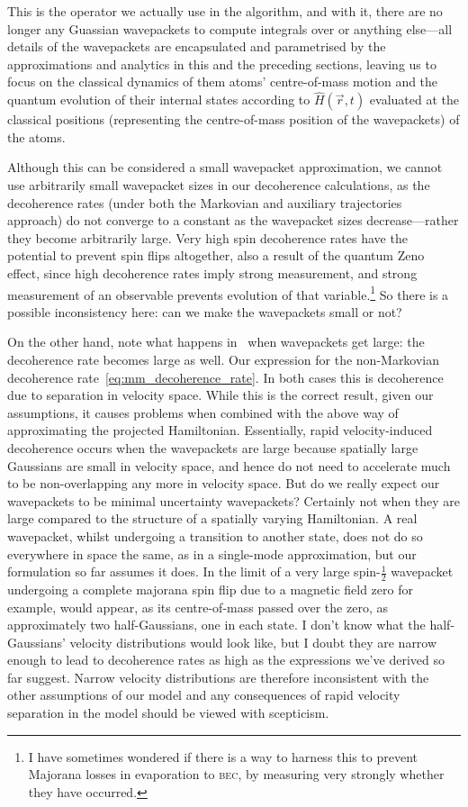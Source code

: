 This is the operator we actually use in the algorithm, and with it, there are no longer any Guassian wavepackets to compute integrals over or anything else---all details of the wavepackets are encapsulated and parametrised by the approximations and analytics in this and the preceding sections, leaving us to focus on the classical dynamics of them atoms' centre-of-mass motion and the quantum evolution of their internal states according to $\hat H(\vec r, t)$ evaluated at the classical positions (representing the centre-of-mass position of the wavepackets) of the atoms.

Although this can be considered a small wavepacket approximation, we cannot use arbitrarily small wavepacket sizes in our decoherence calculations, as the decoherence rates (under both the Markovian and auxiliary trajectories approach) do not converge to a constant as the wavepacket sizes decrease---rather they become arbitrarily large. Very high spin decoherence rates have the potential to prevent spin flips altogether, also a result of the quantum Zeno effect, since high decoherence rates imply strong measurement, and strong measurement of an observable prevents evolution of that variable.\footnote{I have sometimes wondered if there is a way to harness this to prevent Majorana losses in evaporation to \textsc{bec}, by measuring very strongly whether they have occurred.} So there is a possible inconsistency here: can we make the wavepackets small or not?

On the other hand, note what happens in~ when wavepackets get large: the decoherence rate becomes large as well. Our expression for the non-Markovian decoherence rate~\eqref{eq:mm_decoherence_rate}. In both cases this is decoherence due to separation in velocity space. While this is the correct result, given our assumptions, it causes problems when combined with the above way of approximating the projected Hamiltonian. Essentially, rapid velocity-induced decoherence occurs when the wavepackets are large because spatially large Gaussians are small in velocity space, and hence do not need to accelerate much to be non-overlapping any more in velocity space. But do we really expect our wavepackets to be minimal uncertainty wavepackets? Certainly not when they are large compared to the structure of a spatially varying Hamiltonian. A real wavepacket, whilst undergoing a transition to another state, does not do so everywhere in space the same, as in a single-mode approximation, but our formulation so far assumes it does. In the limit of a very large spin-$\frac12$ wavepacket undergoing a complete majorana spin flip due to a magnetic field zero for example, would appear, as its centre-of-mass passed over the zero, as approximately two half-Gaussians, one in each state. I don't know what the half-Gaussians' velocity distributions would look like, but I doubt they are narrow enough to lead to decoherence rates as high as the expressions we've derived so far suggest. Narrow velocity distributions are therefore inconsistent with the other assumptions of our model and any consequences of rapid velocity separation in the model should be viewed with scepticism.

